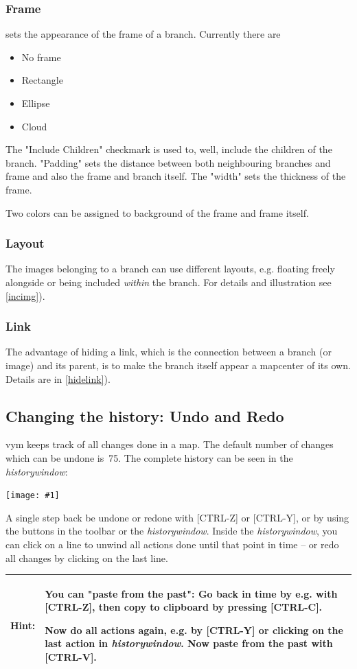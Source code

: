 \documentclass[12pt,a4paper]{article}
\newcommand{\maximage}[1]{  
    \begin{center}
        \texttt{[image: \#1]} 
    \end{center}
}
\newcommand{\hint}[1]{
    \begin{center} 
        \begin{tabular}{|rp{12cm}|} \hline
            {\bf Hint}:& #1\\   \hline
        \end{tabular}
            \marginpar{\Huge !} 
    \end{center} 
}
\newcommand{\vym}{{\sc vym }}
\newcommand{\key}[1]{[#1]}
\begin{document}
\subsubsection*{Frame}
sets the appearance of the frame of a branch. Currently there are
\begin{itemize}
    \item No frame
    \item Rectangle
    \item Ellipse
    \item Cloud
\end{itemize}
The "Include Children" checkmark is used to, well, include the children
of the branch. "Padding" sets the distance between both neighbouring
branches and frame and also the frame and branch itself. The "width"
sets the thickness of the frame.

Two colors can be assigned to background of the frame and frame itself.

\subsubsection*{Layout}
The images belonging to a branch can use different layouts, e.g.
floating freely alongside or being included {\em within} the branch. For
details and illustration see \ref{incimg}).

\subsubsection*{Link}
The advantage of hiding a link, which is the connection between a branch
(or image) and its parent, is to make the branch itself appear a
mapcenter of its own. Details are in   \ref{hidelink}).

\subsection{Changing the history: Undo and Redo}
\vym keeps track of all changes done in a map. The default number of
changes which can be undone is~75. The complete history can be seen in
the {\em historywindow}:
    \maximage{images/historywindow.png}
    \label{historywindow}
A single step back be undone or redone with \key{CTRL-Z} or \key{CTRL-Y},
or by using the buttons in the toolbar or the {\em historywindow}.
Inside the {\em historywindow}, you can click on a line to unwind all
actions done until that point in time -- or redo all changes by clicking
on the last line.

\hint{
    You can "paste from the past": Go back in time by e.g. with
    \key{CTRL-Z}, then copy to clipboard by pressing \key{CTRL-C}.

    Now do all actions again, e.g. by \key{CTRL-Y} or clicking on the
    last action in {\em historywindow}. Now paste from the past with
    \key{CTRL-V}.
}
\end{document}

